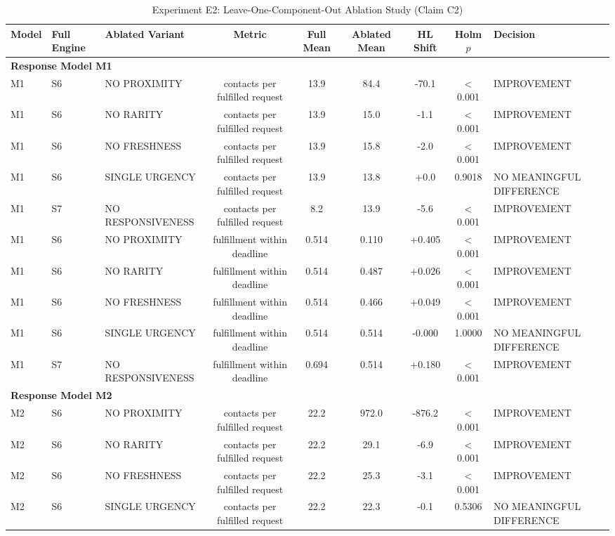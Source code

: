 \begin{table}[t]
\centering
\small
\caption{Experiment E2: Leave-One-Component-Out Ablation Study (Claim C2)}
\label{tab:e2_ablation}
\begin{tabular}{lllcccccl}
\toprule
Model & Full Engine & Ablated Variant & Metric & Full Mean & Ablated Mean & HL Shift & Holm $p$ & Decision \\
\midrule
\multicolumn{9}{l}{\textbf{Response Model M1}} \\
\midrule
M1 & S6 & NO PROXIMITY & contacts per fulfilled request & 13.9 & 84.4 & -70.1 & < 0.001 & IMPROVEMENT \\
M1 & S6 & NO RARITY & contacts per fulfilled request & 13.9 & 15.0 & -1.1 & < 0.001 & IMPROVEMENT \\
M1 & S6 & NO FRESHNESS & contacts per fulfilled request & 13.9 & 15.8 & -2.0 & < 0.001 & IMPROVEMENT \\
M1 & S6 & SINGLE URGENCY & contacts per fulfilled request & 13.9 & 13.8 & +0.0 & 0.9018 & NO MEANINGFUL DIFFERENCE \\
M1 & S7 & NO RESPONSIVENESS & contacts per fulfilled request & 8.2 & 13.9 & -5.6 & < 0.001 & IMPROVEMENT \\
M1 & S6 & NO PROXIMITY & fulfillment within deadline & 0.514 & 0.110 & +0.405 & < 0.001 & IMPROVEMENT \\
M1 & S6 & NO RARITY & fulfillment within deadline & 0.514 & 0.487 & +0.026 & < 0.001 & IMPROVEMENT \\
M1 & S6 & NO FRESHNESS & fulfillment within deadline & 0.514 & 0.466 & +0.049 & < 0.001 & IMPROVEMENT \\
M1 & S6 & SINGLE URGENCY & fulfillment within deadline & 0.514 & 0.514 & -0.000 & 1.0000 & NO MEANINGFUL DIFFERENCE \\
M1 & S7 & NO RESPONSIVENESS & fulfillment within deadline & 0.694 & 0.514 & +0.180 & < 0.001 & IMPROVEMENT \\
\midrule
\multicolumn{9}{l}{\textbf{Response Model M2}} \\
\midrule
M2 & S6 & NO PROXIMITY & contacts per fulfilled request & 22.2 & 972.0 & -876.2 & < 0.001 & IMPROVEMENT \\
M2 & S6 & NO RARITY & contacts per fulfilled request & 22.2 & 29.1 & -6.9 & < 0.001 & IMPROVEMENT \\
M2 & S6 & NO FRESHNESS & contacts per fulfilled request & 22.2 & 25.3 & -3.1 & < 0.001 & IMPROVEMENT \\
M2 & S6 & SINGLE URGENCY & contacts per fulfilled request & 22.2 & 22.3 & -0.1 & 0.5306 & NO MEANINGFUL DIFFERENCE \\

\end{tabular}
\end{table}
